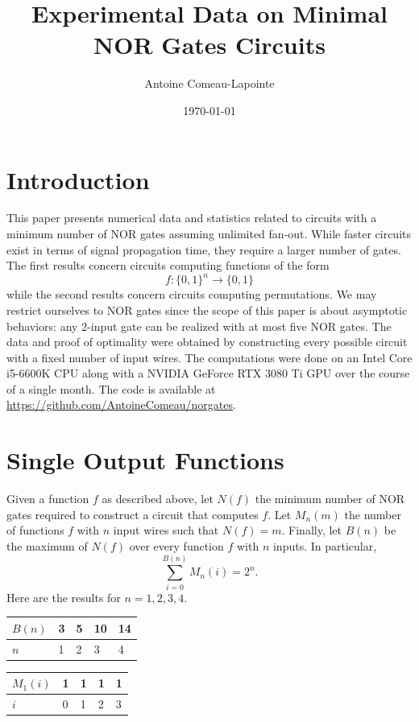 \documentclass[12pt]{amsart}
\begin{document}
\title{Experimental Data on Minimal NOR Gates Circuits}
\author{Antoine Comeau-Lapointe}
\date{\today}
\maketitle


\section{Introduction} 
This paper presents numerical data and statistics related to circuits with a minimum number of NOR gates assuming unlimited fan-out. While faster circuits exist in terms of signal propagation time, they require a larger number of gates. The first results concern circuits computing functions of the form
\[ f: \{0,1\}^n \rightarrow \{0,1\}\]
while the second results concern circuits computing permutations. We may restrict ourselves to NOR gates since the scope of this paper is about asymptotic behaviors: any 2-input gate can be realized with at most five NOR gates. The data and proof of optimality were obtained by constructing every possible circuit with a fixed number of input wires. The computations were done on an Intel Core i5-6600K CPU along with a NVIDIA GeForce RTX 3080 Ti GPU over the course of a single month. The code is available at \url{https://github.com/AntoineComeau/norgates}.

\section{Single Output Functions}
Given a function $f$ as described above, let $N(f)$ the minimum number of NOR gates required to construct a circuit that computes $f$. Let $M_n(m)$ the number of functions $f$ with $n$ input wires such that $N(f)=m$. Finally, let $B(n)$ be the maximum of $N(f)$ over every function $f$ with $n$ inputs. In particular,
\[\sum_{i=0}^{B(n)} M_n(i)=2^n.\]
Here are the results for $n=1,2,3,4$.
\begin{table}[H]
\begin{tabular}{|l|l|l|l|l|}
\hline
$B(n)$ & 3 & 5 & 10 & 14 \\ \hline
$n$    & 1 & 2 & 3  & 4  \\ \hline
\end{tabular}
\end{table}
\begin{table}[H]
\begin{tabular}{|l|l|l|l|l|}
\hline
$M_1(i)$ & 1 & 1 & 1 & 1 \\ \hline
$i$       & 0 & 1 & 2 & 3 \\ \hline
\end{tabular}
\end{table}
\end{document}
